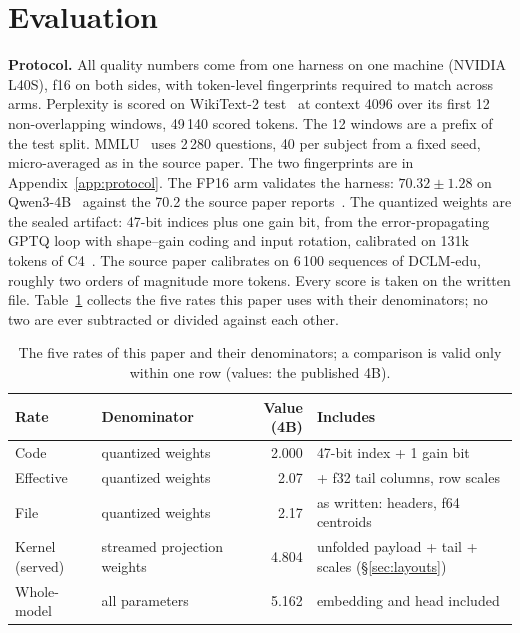 \section{Evaluation}
\label{sec:evaluation}

\textbf{Protocol.} All quality numbers come from one harness on one machine
(NVIDIA L40S), f16 on both sides, with token-level fingerprints required to
match across arms. Perplexity is scored on WikiText-2
test~\citep{wikitext2016} at context 4096 over its first 12 non-overlapping
windows, 49\,140 scored tokens. The 12 windows are a prefix of the test
split. MMLU~\citep{mmlu2021} uses 2\,280 questions, 40 per subject from a
fixed seed, micro-averaged as in the source paper. The two fingerprints are
in Appendix~\ref{app:protocol}. The FP16 arm validates
the harness: $70.32 \pm 1.28$ on Qwen3-4B~\citep{qwen3_2025} against the 70.2
the source paper reports~\citep{llvq2026}. The quantized weights are the
sealed artifact: 47-bit indices plus one gain bit, from the error-propagating
GPTQ loop with shape--gain coding and input rotation, calibrated on 131k
tokens of C4~\citep{c4corpus}. The source paper calibrates on 6\,100
sequences of DCLM-edu, roughly two orders of magnitude more tokens.
Every score is taken on the written file. Table~\ref{tab:rates} collects
the five rates this paper uses with their denominators; no two are ever
subtracted or divided against each other.

\begin{table}[t]
\centering
\scriptsize
\setlength{\tabcolsep}{4pt}
\begin{tabular}{llrl}
\toprule
Rate & Denominator & Value (4B) & Includes \\
\midrule
Code & quantized weights & 2.000 & 47-bit index + 1 gain bit \\
Effective & quantized weights & 2.07 & + f32 tail columns, row scales \\
File & quantized weights & 2.17 & as written: headers, f64 centroids \\
Kernel (served) & streamed projection weights & 4.804 & unfolded payload + tail + scales (\S\ref{sec:layouts}) \\
Whole-model & all parameters & 5.162 & embedding and head included \\
\bottomrule
\end{tabular}
\caption{The five rates of this paper and their denominators; a comparison
is valid only within one row (values: the published 4B).}
\label{tab:rates}
\end{table}

